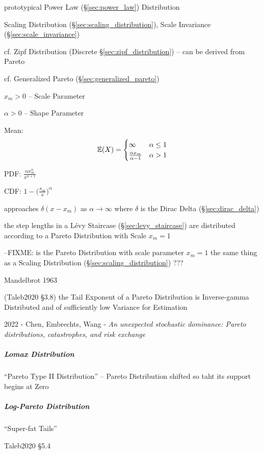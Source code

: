 prototypical Power Law (\S\ref{sec:power_law}) Distribution

Scaling Distribution (\S\ref{sec:scaling_distribution}),
Scale Invariance (\S\ref{sec:scale_invariance})

cf. Zipf Distribution (Discrete \S\ref{sec:zipf_distribution}) -- can be derived
from Pareto

cf. Generalized Pareto (\S\ref{sec:generalized_pareto})

$x_m > 0$ -- Scale Parameter

$\alpha > 0$ -- Shape Parameter

Mean:
\[
  \mathbb{E}(X) = \begin{cases}
    \infty                      & \alpha \leq 1 \\
    \frac{\alpha x_m}{\alpha-1} & \alpha > 1 \\
  \end{cases}
\]

PDF: $\frac{\alpha x_m^\alpha}{x^{\alpha+1}}$

CDF: $1 - \Big(\frac{x_m}{x}\Big)^\alpha$

approaches $\delta(x - x_m)$ as $\alpha \to \infty$ where $\delta$ is the Dirac
Delta (\S\ref{sec:dirac_delta})

the step lengths in a L\'evy Staircase (\S\ref{sec:levy_staircase}) are
distributed according to a Pareto Distribution with Scale $x_m = 1$

--FIXME: is the Pareto Distribution with scale parameter $x_m = 1$ the same
thing as a Scaling Distribution (\S\ref{sec:scaling_distribution}) ???

Mandelbrot 1963

(Taleb2020 \S 3.8) the Tail Exponent of a Pareto Distribution is Inverse-gamma
Distributed and of sufficiently low Variance for Estimation

2022 - Chen, Embrechts, Wang - \emph{An unexpected stochastic dominance: Pareto
distributions, catastrophes, and risk exchange}



\subparagraph{Lomax Distribution}\label{sec:lomax_distribution}\hfill

``Pareto Type II Distribution'' -- Pareto Distribution shifted so taht its
support begins at Zero



\subparagraph{Log-Pareto Distribution}\label{sec:log_pareto}\hfill

``Super-fat Tails''

Taleb2020 \S 5.4




